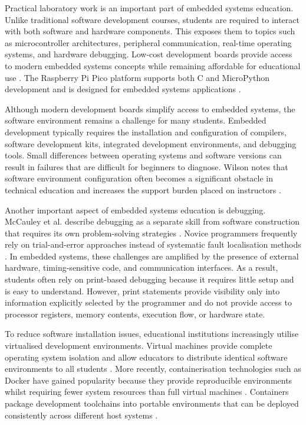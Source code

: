Practical laboratory work is an important part of embedded systems education. Unlike traditional software development courses, students are required to interact with both software and hardware components. This exposes them to topics such as microcontroller architectures, peripheral communication, real-time operating systems, and hardware debugging. Low-cost development boards provide access to modern embedded systems concepts while remaining affordable for educational use \cite{loker}. The Raspberry Pi Pico platform supports both C and MicroPython development and is designed for embedded systems applications \cite{loker}.

Although modern development boards simplify access to embedded systems, the software environment remains a challenge for many students. Embedded development typically requires the installation and configuration of compilers, software development kits, integrated development environments, and debugging tools. Small differences between operating systems and software versions can result in failures that are difficult for beginners to diagnose. Wilson notes that software environment configuration often becomes a significant obstacle in technical education and increases the support burden placed on instructors \cite{wilson2014}.

Another important aspect of embedded systems education is debugging. McCauley et al. describe debugging as a separate skill from software construction that requires its own problem-solving strategies \cite{mccauley2008}. Novice programmers frequently rely on trial-and-error approaches instead of systematic fault localisation methods \cite{mccauley2008}. In embedded systems, these challenges are amplified by the presence of external hardware, timing-sensitive code, and communication interfaces. As a result, students often rely on print-based debugging because it requires little setup and is easy to understand. However, print statements provide visibility only into information explicitly selected by the programmer and do not provide access to processor registers, memory contents, execution flow, or hardware state.

To reduce software installation issues, educational institutions increasingly utilise virtualised development environments. Virtual machines provide complete operating system isolation and allow educators to distribute identical software environments to all students \cite{wilson2014}. More recently, containerisation technologies such as Docker have gained popularity because they provide reproducible environments whilst requiring fewer system resources than full virtual machines \cite{merkel2014}. Containers package development toolchains into portable environments that can be deployed consistently across different host systems \cite{boettiger2015}.


